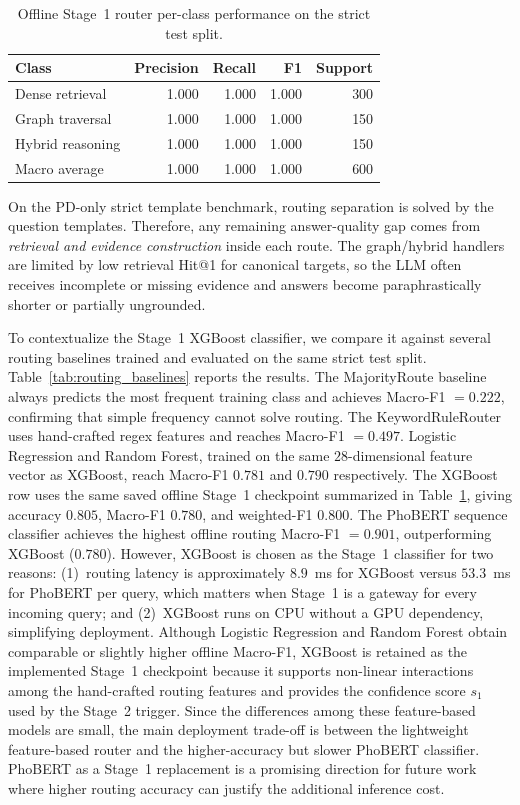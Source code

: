 \documentclass[11pt,twocolumn]{article}
\begin{document}
\begin{table}[!htbp]
\centering
\caption{Offline Stage~1 router per-class performance on the strict test split.}
\label{tab:per_class_stage1}
\scriptsize
\setlength{\tabcolsep}{3.0pt}
\begin{tabular}{lrrrr}
\toprule
\textbf{Class} & \textbf{Precision} & \textbf{Recall} & \textbf{F1} & \textbf{Support} \\
\midrule
Dense retrieval & 1.000 & 1.000 & 1.000 & 300 \\
Graph traversal & 1.000 & 1.000 & 1.000 & 150 \\
Hybrid reasoning & 1.000 & 1.000 & 1.000 & 150 \\
\midrule
Macro average & 1.000 & 1.000 & 1.000 & 600 \\
\bottomrule
\end{tabular}
\end{table}

On the PD-only strict template benchmark, routing separation is
solved by the question templates. Therefore, any remaining
answer-quality gap comes from \emph{retrieval and evidence
construction} inside each route. The graph/hybrid handlers are
limited by low retrieval Hit@1 for canonical targets, so the LLM
often receives incomplete or missing evidence and answers become
paraphrastically shorter or partially ungrounded.

To contextualize the Stage~1 XGBoost classifier, we compare
it against several routing baselines trained and evaluated
on the same strict test split.
Table~\ref{tab:routing_baselines} reports the results.
The MajorityRoute baseline always predicts the most frequent
training class and achieves Macro-F1 $=0.222$, confirming
that simple frequency cannot solve routing. The
KeywordRuleRouter uses hand-crafted regex features and
reaches Macro-F1 $=0.497$. Logistic Regression and Random
Forest, trained on the same $28$-dimensional feature vector
as XGBoost, reach Macro-F1 $0.781$ and $0.790$ respectively.
The XGBoost row uses the same saved offline Stage~1 checkpoint
summarized in Table~\ref{tab:per_class_stage1}, giving
accuracy $0.805$, Macro-F1 $0.780$, and weighted-F1 $0.800$.
The PhoBERT sequence classifier achieves the highest
offline routing Macro-F1 $=0.901$, outperforming XGBoost
($0.780$). However, XGBoost is chosen as the Stage~1
classifier for two reasons: (1)~routing latency is
approximately $8.9$~ms for XGBoost versus $53.3$~ms for
PhoBERT per query, which matters when Stage~1 is a
gateway for every incoming query; and (2)~XGBoost runs on
CPU without a GPU dependency, simplifying deployment.
Although Logistic Regression and Random Forest obtain
comparable or slightly higher offline Macro-F1, XGBoost is
retained as the implemented Stage~1 checkpoint because it
supports non-linear interactions among the hand-crafted
routing features and provides the confidence score $s_1$ used
by the Stage~2 trigger. Since the differences among these
feature-based models are small, the main deployment trade-off
is between the lightweight feature-based router and the
higher-accuracy but slower PhoBERT classifier.
PhoBERT as a Stage~1 replacement is a promising direction
for future work where higher routing accuracy can justify
the additional inference cost.
\end{document}
